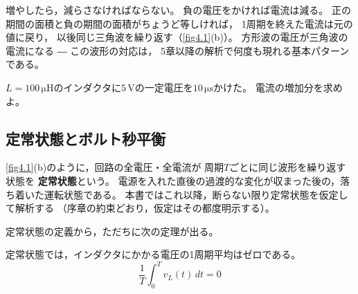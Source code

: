 増やしたら，減らさなければならない。
負の電圧をかければ電流は減る。
正の期間の面積と負の期間の面積がちょうど等しければ，
1周期を終えた電流は元の値に戻り，
以後同じ三角波を繰り返す（\ref{fig4.1}(b)）。
方形波の電圧が三角波の電流になる ― この波形の対応は，
5章以降の解析で何度も現れる基本パターンである。

\begin{問}
\item $L = 100\,\mathrm{\mu H}$のインダクタに$5$\,Vの一定電圧を$10\,\mathrm{\mu s}$かけた。
電流の増加分を求めよ。
\end{問}

\subsection{定常状態とボルト秒平衡}

\ref{fig4.1}(b)のように，回路の全電圧・全電流が
周期$T$ごとに同じ波形を繰り返す状態を
\textbf{定常状態}という。
電源を入れた直後の過渡的な変化が収まった後の，落ち着いた運転状態である。
本書ではこれ以降，断らない限り定常状態を仮定して解析する
（序章の約束どおり，仮定はその都度明示する）。

\begin{注意}
\end{注意}

定常状態の定義から，ただちに次の定理が出る。

\begin{定理}[インダクタのボルト秒平衡]
\label{th4.1}
定常状態では，インダクタにかかる電圧の1周期平均はゼロである。
\begin{equation}
\frac{1}{T}\int_0^{T} v_L(t)\,dt = 0
\label{eq4.6}
\end{equation}
\end{定理}

